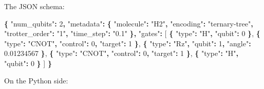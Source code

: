 \documentclass[
  11pt,
  oneside]{book}
\newenvironment{Shaded}{\begin{snugshade}}{\end{snugshade}}
\newcommand{\DataTypeTok}[1]{\textcolor[rgb]{0.13,0.29,0.53}{#1}}
\newcommand{\DecValTok}[1]{\textcolor[rgb]{0.00,0.00,0.81}{#1}}
\newcommand{\FloatTok}[1]{\textcolor[rgb]{0.00,0.00,0.81}{#1}}
\newcommand{\FunctionTok}[1]{\textcolor[rgb]{0.13,0.29,0.53}{\textbf{#1}}}
\newcommand{\OtherTok}[1]{\textcolor[rgb]{0.56,0.35,0.01}{#1}}
\newcommand{\StringTok}[1]{\textcolor[rgb]{0.31,0.60,0.02}{#1}}
\begin{document}
The JSON schema:

\begin{Shaded}
\begin{Highlighting}[]
\FunctionTok{\{}
  \DataTypeTok{"num\_qubits"}\FunctionTok{:} \DecValTok{2}\FunctionTok{,}
  \DataTypeTok{"metadata"}\FunctionTok{:} \FunctionTok{\{}
    \DataTypeTok{"molecule"}\FunctionTok{:} \StringTok{"H2"}\FunctionTok{,}
    \DataTypeTok{"encoding"}\FunctionTok{:} \StringTok{"ternary{-}tree"}\FunctionTok{,}
    \DataTypeTok{"trotter\_order"}\FunctionTok{:} \StringTok{"1"}\FunctionTok{,}
    \DataTypeTok{"time\_step"}\FunctionTok{:} \StringTok{"0.1"}
  \FunctionTok{\},}
  \DataTypeTok{"gates"}\FunctionTok{:} \OtherTok{[}
    \FunctionTok{\{} \DataTypeTok{"type"}\FunctionTok{:} \StringTok{"H"}\FunctionTok{,} \DataTypeTok{"qubit"}\FunctionTok{:} \DecValTok{0} \FunctionTok{\}}\OtherTok{,}
    \FunctionTok{\{} \DataTypeTok{"type"}\FunctionTok{:} \StringTok{"CNOT"}\FunctionTok{,} \DataTypeTok{"control"}\FunctionTok{:} \DecValTok{0}\FunctionTok{,} \DataTypeTok{"target"}\FunctionTok{:} \DecValTok{1} \FunctionTok{\}}\OtherTok{,}
    \FunctionTok{\{} \DataTypeTok{"type"}\FunctionTok{:} \StringTok{"Rz"}\FunctionTok{,} \DataTypeTok{"qubit"}\FunctionTok{:} \DecValTok{1}\FunctionTok{,} \DataTypeTok{"angle"}\FunctionTok{:} \FloatTok{0.01234567} \FunctionTok{\}}\OtherTok{,}
    \FunctionTok{\{} \DataTypeTok{"type"}\FunctionTok{:} \StringTok{"CNOT"}\FunctionTok{,} \DataTypeTok{"control"}\FunctionTok{:} \DecValTok{0}\FunctionTok{,} \DataTypeTok{"target"}\FunctionTok{:} \DecValTok{1} \FunctionTok{\}}\OtherTok{,}
    \FunctionTok{\{} \DataTypeTok{"type"}\FunctionTok{:} \StringTok{"H"}\FunctionTok{,} \DataTypeTok{"qubit"}\FunctionTok{:} \DecValTok{0} \FunctionTok{\}}
  \OtherTok{]}
\FunctionTok{\}}
\end{Highlighting}
\end{Shaded}

On the Python side:
\end{document}
